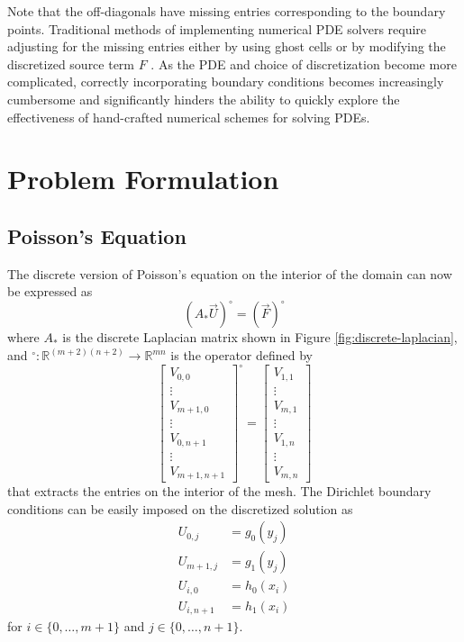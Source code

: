 \documentclass[conference]{IEEEtran}
\begin{document}
Note that the off-diagonals have missing entries corresponding to the boundary points. Traditional methods of implementing numerical PDE solvers require adjusting for the missing entries either by using ghost cells  or by modifying the discretized source term $F$ . As the PDE and choice of discretization become more complicated, correctly incorporating boundary conditions becomes increasingly cumbersome and significantly hinders the ability to quickly explore the effectiveness of hand-crafted numerical schemes for solving PDEs.


\section{Problem Formulation}

\subsection{Poisson's Equation}

The discrete version of Poisson's equation on the interior of the domain can now be expressed as
\begin{equation}
  (A_* \vec{U})^\circ = (\vec{F})^\circ
\end{equation}
where $A_*$ is the discrete Laplacian matrix shown in Figure \ref{fig:discrete-laplacian}, and ${}^\circ : \mathbb{R}^{(m+2)(n+2)} \to \mathbb{R}^{mn}$ is the operator defined by
\begin{equation}
  \begin{bmatrix}
    V_{0,0} \\ \vdots \\ V_{m+1,0} \\ \vdots \\ V_{0,n+1} \\ \vdots \\ V_{m+1,n+1}
  \end{bmatrix}^\circ = \begin{bmatrix}
    V_{1,1} \\ \vdots \\ V_{m,1} \\ \vdots \\ V_{1,n} \\ \vdots \\ V_{m,n}
  \end{bmatrix}
\end{equation}
that extracts the entries on the interior of the mesh. The Dirichlet boundary conditions can be easily imposed on the discretized solution as
\begin{align}
  U_{0,j} &= g_0(y_j) \\
  U_{m+1,j} &= g_1(y_j) \\
  U_{i,0} &= h_0(x_i) \\
  U_{i,n+1} &= h_1(x_i)
\end{align}
for $i \in \{0,\ldots,m+1\}$ and $j \in \{0,\ldots,n+1\}$.
\end{document}
